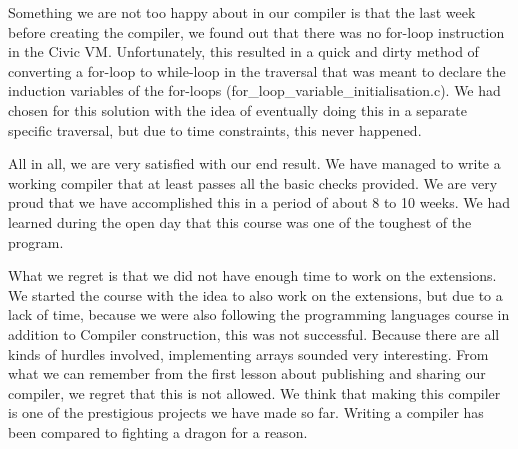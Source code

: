 \documentclass[hidelinks]{uva-inf-article}
\begin{document}
Something we are not too happy about in our compiler is that the last week before creating the compiler, we found out that there was no for-loop instruction in the Civic VM. 
Unfortunately, this resulted in a quick and dirty method of converting a for-loop to while-loop in the traversal that was meant to declare the induction variables of the for-loops 
(for\_loop\_variable\_initialisation.c). 
We had chosen for this solution with the idea of eventually doing this in a separate specific traversal, 
but due to time constraints, this never happened.

All in all, we are very satisfied with our end result. 
We have managed to write a working compiler that at least passes all the basic checks provided. 
We are very proud that we have accomplished this in a period of about 8 to 10 weeks. 
We had learned during the open day that this course was one of the toughest of the program.

What we regret is that we did not have enough time to work on the extensions. 
We started the course with the idea to also work on the extensions, but due to a lack of time,
because we were also following the programming languages course in addition to Compiler construction, this was not successful.
Because there are all kinds of hurdles involved, implementing arrays sounded very interesting.
From what we can remember from the first lesson about publishing and sharing our compiler, 
we regret that this is not allowed. We think that making this compiler is one of the prestigious projects we have made so far. 
Writing a compiler has been compared to fighting a dragon for a reason.
\end{document}
